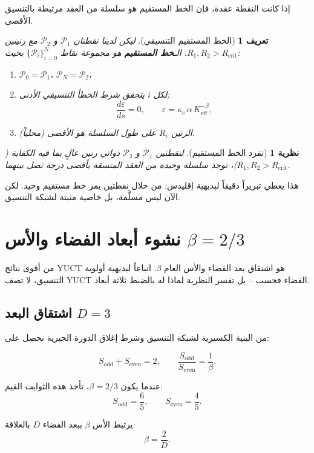 \documentclass[12pt,a4paper]{article}
\newtheorem{theorem}{نظرية}
\newtheorem{definition}{تعريف}
\newcommand{\Keff}{K_{\mathrm{eff}}}
\newcommand{\kappac}{\kappa_c}
\newcommand{\eps}{\varepsilon}
\newcommand{\betaf}{\beta}
\newcommand{\Sodd}{S_{\mathrm{odd}}}
\newcommand{\Seven}{S_{\mathrm{even}}}
\newcommand{\Rcrit}{R_{\mathrm{crit}}}
\newcommand{\calP}{\mathcal{P}}
\begin{document}
	إذا كانت النقطة عقدة، فإن الخط المستقيم هو سلسلة من العقد مرتبطة بالتنسيق الأقصى.
	
	\begin{definition}[الخط المستقيم التنسيقي]
		ليكن لدينا نقطتان \(\calP_1\) و \(\calP_2\) مع رنينين \(R_1, R_2 > \Rcrit\). الـ\textbf{خط المستقيم} هو مجموعة نقاط \(\{\calP_i\}_{i=0}^{N}\) بحيث:
		\begin{enumerate}
			\item \(\calP_0 = \calP_1\)، \(\calP_N = \calP_2\)،
			\item لكل \(i\) يتحقق شرط الخطأ التنسيقي الأدنى:
			\[
			\frac{d\eps}{ds} = 0, \qquad \eps = \kappac\,\alpha\,\Keff^{-\betaf},
			\]
			\item الرنين \(R_i\) على طول السلسلة هو الأقصى (محلياً).
		\end{enumerate}
	\end{definition}
	
	\begin{theorem}[تفرد الخط المستقيم]
		لنقطتين \(\calP_1\) و \(\calP_2\) ذواتي رنين عالٍ بما فيه الكفاية (\(R_1, R_2 > \Rcrit\))، توجد سلسلة وحيدة من العقد المتسقة بأقصى درجة تصل بينهما.
	\end{theorem}
	
	هذا يعطي تبريراً دقيقاً لبديهية إقليدس: من خلال نقطتين يمر خط مستقيم وحيد. لكن الآن ليس مسلَّمة، بل خاصية مثبتة لشبكة التنسيق.
	
	\section{نشوء أبعاد الفضاء والأس \(\betaf = 2/3\)}
	
	من أقوى نتائج YUCT هو اشتقاق بعد الفضاء والأس العام \(\betaf\). اتباعاً لبديهية أولوية التنسيق، لا تصف YUCT الفضاء فحسب – بل تفسر النظرية لماذا له بالضبط ثلاثة أبعاد.
	
	\subsection{اشتقاق البعد \(D=3\)}
	
	من البنية الكسيرية لشبكة التنسيق وشرط إغلاق الدورة الجبرية نحصل على:
	
	\[
	\Sodd + \Seven = 2, \qquad \frac{\Sodd}{\Seven} = \frac{1}{\betaf}.
	\]
	
	عندما يكون \(\betaf = 2/3\)، تأخذ هذه الثوابت القيم:
	\[
	\Sodd = \frac{6}{5}, \qquad \Seven = \frac{4}{5}.
	\]
	
	يرتبط الأس \(\betaf\) ببعد الفضاء \(D\) بالعلاقة:
	\[
	\betaf = \frac{2}{D}.
	\]
	
\end{document}
